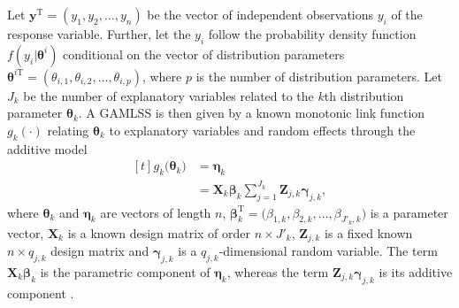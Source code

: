 Let \(\symbf{y}^{\text{T}} = (y_1, y_2, \ldots, y_n)\) be the vector of independent observations \(y_i\) of the response variable.  Further, let the \(y_i\) follow the probability density function \(f(y_i|\symbf{\theta}^i)\) conditional on the vector of distribution parameters \(\symbf{\theta}^{i \text{T}} = (\theta_{i, 1}, \theta_{i, 2}, \ldots, \theta_{i, p})\), where \(p\) is the number of distribution parameters. Let \(J_k\) be the number of explanatory variables related to the \(k\)th distribution parameter \(\symbf{\theta}_k\).  A GAMLSS is then given by a known monotonic link function \(g_k(\cdot)\) relating \(\symbf{\theta}_k\) to explanatory variables and random effects through the additive model 
\begin{equation}
  \label{eq:GAMLSSRigbyStasinopoulos2005}
  \begin{aligned}[t]
    g_k\bigl(\symbf{\theta}_k\bigr) &= \symbf{\eta}_k \\
    &= \symbf{X}_k \symbf{\beta}_k \sum_{j = 1}^{J_k} \symbf{Z}_{j, k} \symbf{\gamma}_{j, k},
\end{aligned}
\end{equation}
where \(\symbf{\theta}_k\) and \(\symbf{\eta}_k\) are vectors of length \(n\), \(\symbf{\beta}_k^{\text{T}} = \bigl(\beta_{1, k}, \beta_{2, k}, \ldots, \beta_{J'_k, k}\bigr)\) is a parameter vector, \(\symbf{X}_k\) is a known design matrix of order \(n \times J'_k\), \(\symbf{Z}_{j, k}\) is a fixed known \(n \times q_{j, k}\) design matrix and \(\symbf{\gamma}_{j, k}\) is a \(q_{j, k}\)-dimensional random variable.  The term \(\symbf{X}_k \symbf{\beta}_k\) is the parametric component of \(\symbf{\eta}_k\), whereas the term \(\symbf{Z}_{j, k} \symbf{\gamma}_{j, k}\) is its additive component \parencite{Rigby2005}.

